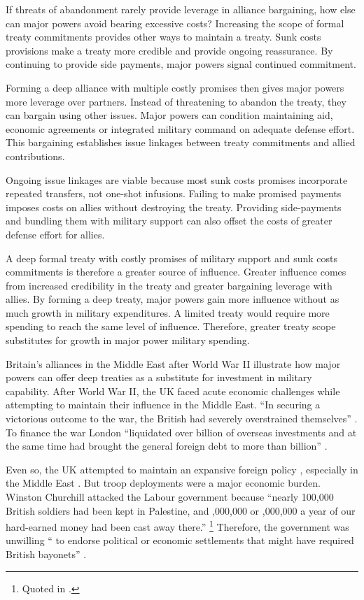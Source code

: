 \documentclass[12pt]{article}
\begin{document}
If threats of abandonment rarely provide leverage in alliance bargaining, how else can major powers avoid bearing excessive costs? 
Increasing the scope of formal treaty commitments provides other ways to maintain a treaty.
Sunk costs provisions make a treaty more credible and provide ongoing reassurance.
By continuing to provide side payments, major powers signal continued commitment. 

 
Forming a deep alliance with multiple costly promises then gives major powers more leverage over partners. 
Instead of threatening to abandon the treaty, they can bargain using other issues. 
Major powers can condition maintaining aid, economic agreements or integrated military command on adequate defense effort.
This bargaining establishes issue linkages between treaty commitments and allied contributions. 


Ongoing issue linkages are viable because most sunk costs promises incorporate repeated transfers, not one-shot infusions. 
Failing to make promised payments imposes costs on allies without destroying the treaty. 
Providing side-payments and bundling them with military support can also offset the costs of greater defense effort for allies. 


A deep formal treaty with costly promises of military support and sunk costs commitments is therefore a greater source of influence.
Greater influence comes from increased credibility in the treaty and greater bargaining leverage with allies.  
By forming a deep treaty, major powers gain more influence without as much growth in military expenditures. 
A limited treaty would require more spending to reach the same level of influence. 
Therefore, greater treaty scope substitutes for growth in major power military spending. 


Britain's alliances in the Middle East after World War II illustrate how major powers can offer deep treaties as a substitute for investment in military capability. 
After World War II, the UK faced acute economic challenges while attempting to maintain their influence in the Middle East. 
``In securing a victorious outcome to the war, the British had severely overstrained themselves'' \citep[pg. 367]{Kennedy1987}. 
To finance the war London ``liquidated over  billion of overseas investments and at the same time had brought the general foreign debt to more than  billion'' \citep[pg. 12]{Louis1984}.
 

Even so, the UK attempted to maintain an expansive foreign policy \citep{Mayhew1950}, especially in the Middle East \citep{Rahman1982}. 
But troop deployments were a major economic burden. 
Winston Churchill attacked the Labour government because ``nearly 100,000 British soldiers had been kept in Palestine, and ,000,000 or ,000,000 a year of our hard-earned money had been cast away there.''
\footnote{Quoted in \citet[pg. 11]{Louis1984}.}
Therefore, the government was unwilling `` to endorse political or economic settlements that might have required British bayonets'' \citep[pg. 15]{Louis1984}. 
\end{document}
